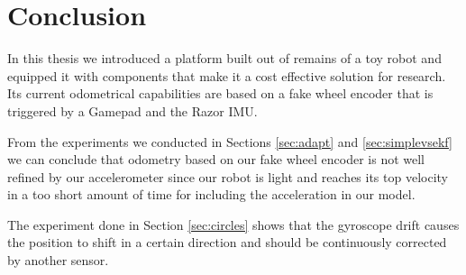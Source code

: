\documentclass[class=report, crop=false]{standalone}
\begin{document}
\chapter{Conclusion}\label{cha:conclusion}

In this thesis we introduced a platform built out of remains of a toy robot and equipped it with components that make it a cost effective solution for research. Its current odometrical capabilities are based on a fake wheel encoder that is triggered by a Gamepad and the Razor IMU.

From the experiments we conducted in Sections \ref{sec:adapt} and \ref{sec:simplevsekf} we can conclude that odometry based on our fake wheel encoder is not well refined by our accelerometer since our robot is light and reaches its top velocity in a too short amount of time for including the acceleration in our model.

The experiment done in Section \ref{sec:circles} shows that the gyroscope drift causes the position to shift in a certain direction and should be continuously corrected by another sensor.
\end{document}

